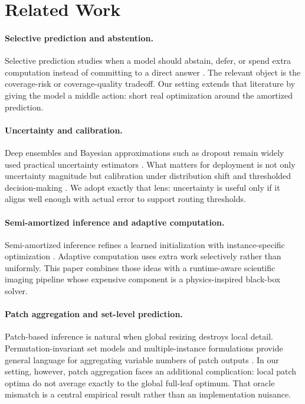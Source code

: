 \documentclass[11pt,a4paper]{article}
\begin{document}
\section{Related Work}
\paragraph{Selective prediction and abstention.}
Selective prediction studies when a model should abstain, defer, or spend extra computation instead of committing to a direct answer \citep{B_elyaniv2010,B_geifman2017,B_geifman2019}.
The relevant object is the coverage-risk or coverage-quality tradeoff.
Our setting extends that literature by giving the model a middle action: short real optimization around the amortized prediction.

\paragraph{Uncertainty and calibration.}
Deep ensembles and Bayesian approximations such as dropout remain widely used practical uncertainty estimators \citep{B_lakshminarayanan2017,B_gal2016}.
What matters for deployment is not only uncertainty magnitude but calibration under distribution shift and thresholded decision-making \citep{B_ovadia2019,B_guo2017}.
We adopt exactly that lens: uncertainty is useful only if it aligns well enough with actual error to support routing thresholds.

\paragraph{Semi-amortized inference and adaptive computation.}
Semi-amortized inference refines a learned initialization with instance-specific optimization \citep{B_kim2018,B_marino2018}.
Adaptive computation uses extra work selectively rather than uniformly.
This paper combines those ideas with a runtime-aware scientific imaging pipeline whose expensive component is a physics-inspired black-box solver.

\paragraph{Patch aggregation and set-level prediction.}
Patch-based inference is natural when global resizing destroys local detail.
Permutation-invariant set models and multiple-instance formulations provide general language for aggregating variable numbers of patch outputs \citep{B_zaheer2017,B_ilse2018}.
In our setting, however, patch aggregation faces an additional complication: local patch optima do not average exactly to the global full-leaf optimum.
That oracle mismatch is a central empirical result rather than an implementation nuisance.
\end{document}
